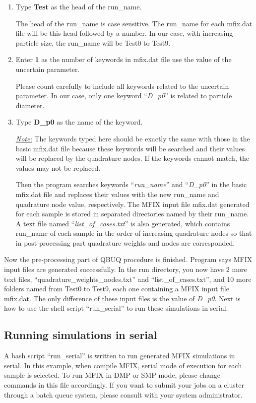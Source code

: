\documentclass[a4paper,12pt,titlepage]{article}
\begin{document}
\begin{enumerate}[resume,leftmargin=0cm,itemindent=0.5cm]
 \item Type \textbf{Test} as the head of the run\_name.
 
 The head of the run\_name is case sensitive. The run\_name for each mfix.dat 
 file will be this head followed by a number. In our case, with increasing 
 particle size, the run\_name will be Test0 to Test9.
 
 \item Enter \textbf{1} as the number of keywords in mfix.dat file use the value
 of the uncertain parameter.
 
 Please count carefully to include all keywords related to the uncertain 
 parameter. In our case, only one keyword ``\emph{D\_p0}'' is related to 
 particle diameter.
 
 \item Type \textbf{D\_p0} as the name of the keyword.
 
 \emph{\underline{Note:}} The keywords typed here should be exactly the same 
 with those in the basic mfix.dat file because these keywords will be searched 
 and their values will be replaced by the quadrature nodes. If the keywords 
 cannot match, the values may not be replaced.
 
Then the program searches keywords ``\emph{run\_name}'' and  ``\emph{D\_p0}'' in 
the basic mfix.dat file and replaces their values with the new run\_name and 
quadrature node value, respectively. The MFIX input file mfix.dat generated for 
each sample is stored in separated directories named by their run\_name. A text
file named ``\emph{list\_of\_cases.txt}'' is also generated, which contains 
run\_name of each sample in the order of increasing quadrature nodes so that in
post-processing part quadrature weights and nodes are corresponded.
\end{enumerate}

Now the pre-processing part of QBUQ procedure is finished. Program says MFIX 
input files are generated successfully. In the run directory, you now have 2 
more text files, ``quadrature\_weights\_nodes.txt'' and ``list\_of\_cases.txt'', 
and 10 more folders named from Test0 to Test9, each one containing a MFIX input 
file mfix.dat. The only difference of these input files is the value of 
\emph{D\_p0}. Next is how to use the shell script ``run\_serial'' to run these 
simulations in serial.

\subsection{Running simulations in serial}
\label{sec:RunSerial}
A bash script ``run\_serial'' is written to run generated MFIX simulations in 
serial. In this example, when compile MFIX, serial mode of execution for each 
sample is selected. To run MFIX in DMP or SMP mode, please change commands
in this file accordingly. If you want to submit your jobs on a cluster through
a batch queue system, please consult with your system administrator.
\end{document}
